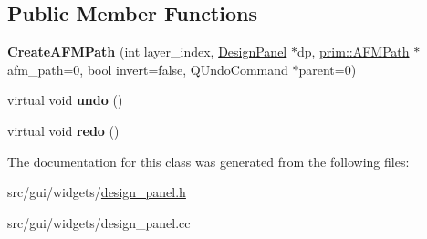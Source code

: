 \subsection*{Public Member Functions}
\begin{DoxyCompactItemize}
\item 
{\bfseries Create\+A\+F\+M\+Path} (int layer\+\_\+index, \hyperlink{classgui_1_1DesignPanel}{Design\+Panel} $\ast$dp, \hyperlink{classprim_1_1AFMPath}{prim\+::\+A\+F\+M\+Path} $\ast$afm\+\_\+path=0, bool invert=false, Q\+Undo\+Command $\ast$parent=0)\hypertarget{classgui_1_1DesignPanel_1_1CreateAFMPath_a154cda6605b6668a1a6e47364b81bab3}{}\label{classgui_1_1DesignPanel_1_1CreateAFMPath_a154cda6605b6668a1a6e47364b81bab3}

\item 
virtual void {\bfseries undo} ()\hypertarget{classgui_1_1DesignPanel_1_1CreateAFMPath_aab5043ca7a780fcd9bef4e1b43d7a65d}{}\label{classgui_1_1DesignPanel_1_1CreateAFMPath_aab5043ca7a780fcd9bef4e1b43d7a65d}

\item 
virtual void {\bfseries redo} ()\hypertarget{classgui_1_1DesignPanel_1_1CreateAFMPath_a8a4c96b9717d9817b2636c987051cd4b}{}\label{classgui_1_1DesignPanel_1_1CreateAFMPath_a8a4c96b9717d9817b2636c987051cd4b}

\end{DoxyCompactItemize}


The documentation for this class was generated from the following files\+:\begin{DoxyCompactItemize}
\item 
src/gui/widgets/\hyperlink{design__panel_8h}{design\+\_\+panel.\+h}\item 
src/gui/widgets/design\+\_\+panel.\+cc\end{DoxyCompactItemize}
